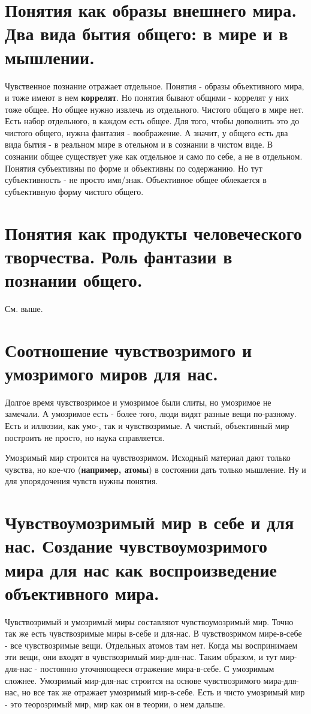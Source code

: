 \section{ Понятия как образы внешнего мира. Два вида бытия общего: в мире и в мышлении.}
Чувственное познание отражает отдельное. Понятия - образы объективного мира, и тоже имеют в нем \textbf{коррелят}. Но понятия бывают общими - коррелят у них тоже общее. Но общее нужно извлечь из отдельного. Чистого общего в мире нет. Есть набор отдельного, в каждом есть общее. Для того, чтобы дополнить это до чистого общего, нужна фантазия - воображение. А значит, у общего есть два вида бытия  - в реальном мире в отельном и в сознании в чистом виде. В сознании общее существует уже как отдельное и само по себе, а не в отдельном. Понятия субъективны по форме и объективны по содержанию. Но тут субъективность - не просто имя/знак. Объективное общее облекается в субъективную форму чистого общего. 

\section{ Понятия как продукты человеческого творчества. Роль фантазии в познании общего.}
См. выше.

\section{ Соотношение чувствозримого и умозримого миров для нас.}
Долгое время чувствозримое и умозримое были слиты, но  умозримое не замечали. А умозримое есть - более того, люди видят разные вещи по-разному. Есть и иллюзии, как умо-, так и чувствозримые. А чистый, объективный мир построить не просто, но наука справляется.

Умозримый мир строится на чувствозримом. Исходный материал дают только чувства, но кое-что (\textbf{например, атомы}) в состоянии дать только мышление. Ну и для упорядочения чувств нужны понятия.

\section{ Чувствоумозримый мир в себе и для нас. Создание чувствоумозримого мира для нас как воспроизведение объективного мира.}
Чувствозримый и умозримый миры составляют чувствоумозримый мир. Точно так же есть чувствозримые миры в-себе и для-нас. В чувствозримом мире-в-себе - все чувствозримые вещи. Отдельных атомов там нет. Когда мы воспринимаем эти вещи, они входят в чувствозримый мир-для-нас. Таким образом, и тут мир-для-нас - постоянно уточняющееся отражение мира-в-себе. С умозримым сложнее. Умозримый мир-для-нас строится на основе чувствозримого мира-для-нас, но все так же отражает умозримый мир-в-себе. Есть и чисто умозримый мир  - это теорозримый мир, мир как он в теории, о нем дальше.

